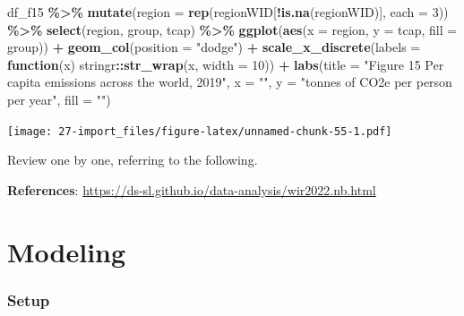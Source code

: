 \documentclass[
  xelatex, ja=standard]{bxjsbook}
\newenvironment{Shaded}{\begin{snugshade}}{\end{snugshade}}
\newcommand{\AttributeTok}[1]{\textcolor[rgb]{0.13,0.29,0.53}{#1}}
\newcommand{\ControlFlowTok}[1]{\textcolor[rgb]{0.13,0.29,0.53}{\textbf{#1}}}
\newcommand{\DecValTok}[1]{\textcolor[rgb]{0.00,0.00,0.81}{#1}}
\newcommand{\FunctionTok}[1]{\textcolor[rgb]{0.13,0.29,0.53}{\textbf{#1}}}
\newcommand{\NormalTok}[1]{#1}
\newcommand{\SpecialCharTok}[1]{\textcolor[rgb]{0.81,0.36,0.00}{\textbf{#1}}}
\newcommand{\StringTok}[1]{\textcolor[rgb]{0.31,0.60,0.02}{#1}}
\theoremstyle{definition}
\theoremstyle{definition}
\theoremstyle{definition}
\theoremstyle{definition}
\theoremstyle{remark}
\begin{document}
\begin{Shaded}
\begin{Highlighting}[]
\NormalTok{df\_f15 }\SpecialCharTok{\%\textgreater{}\%} \FunctionTok{mutate}\NormalTok{(}\AttributeTok{region =} \FunctionTok{rep}\NormalTok{(regionWID[}\SpecialCharTok{!}\FunctionTok{is.na}\NormalTok{(regionWID)], }\AttributeTok{each =} \DecValTok{3}\NormalTok{)) }\SpecialCharTok{\%\textgreater{}\%}
  \FunctionTok{select}\NormalTok{(region, group, tcap) }\SpecialCharTok{\%\textgreater{}\%}
  \FunctionTok{ggplot}\NormalTok{(}\FunctionTok{aes}\NormalTok{(}\AttributeTok{x =}\NormalTok{ region, }\AttributeTok{y =}\NormalTok{ tcap, }\AttributeTok{fill =}\NormalTok{ group)) }\SpecialCharTok{+}
  \FunctionTok{geom\_col}\NormalTok{(}\AttributeTok{position =} \StringTok{"dodge"}\NormalTok{) }\SpecialCharTok{+} 
  \FunctionTok{scale\_x\_discrete}\NormalTok{(}\AttributeTok{labels =} \ControlFlowTok{function}\NormalTok{(x) stringr}\SpecialCharTok{::}\FunctionTok{str\_wrap}\NormalTok{(x, }\AttributeTok{width =} \DecValTok{10}\NormalTok{)) }\SpecialCharTok{+}
  \FunctionTok{labs}\NormalTok{(}\AttributeTok{title =} \StringTok{"Figure 15 Per capita emissions across the world, 2019"}\NormalTok{, }
       \AttributeTok{x =} \StringTok{""}\NormalTok{, }\AttributeTok{y =} \StringTok{"tonnes of CO2e per person per year"}\NormalTok{, }\AttributeTok{fill =} \StringTok{""}\NormalTok{)}
\end{Highlighting}
\end{Shaded}

\texttt{[image: 27-import\_files/figure-latex/unnamed-chunk-55-1.pdf]}

Review one by one, referring to the following.

\textbf{References}: \url{https://ds-sl.github.io/data-analysis/wir2022.nb.html}

\hypertarget{modeling}{%
\chapter{Modeling}\label{modeling}}

\hypertarget{setup-1}{%
\subsection*{Setup}\label{setup-1}}
\end{document}

